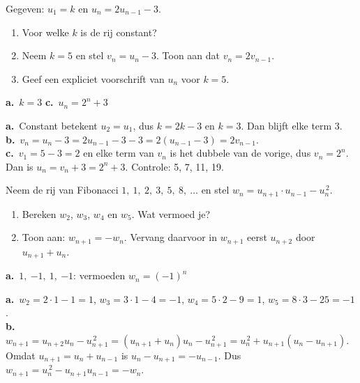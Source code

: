\begin{oefeningen}
\begin{oefening}[3]
Gegeven: $u_1 = k$ en $u_n = 2u_{n-1} - 3$.
\begin{enumerate}
  \item Voor welke $k$ is de rij constant?
  \item Neem $k = 5$ en stel $v_n = u_n - 3$. Toon aan dat $v_n = 2v_{n-1}$.
  \item Geef een expliciet voorschrift van $u_n$ voor $k = 5$.
\end{enumerate}
\begin{solution}
\textbf{a.}~$k=3$ \quad \textbf{c.}~$u_n=2^n+3$
\end{solution}
\begin{fullsolution}
\textbf{a.}~Constant betekent $u_2=u_1$, dus $k=2k-3$ en $k=3$. Dan blijft elke term 3.\\
\textbf{b.}~$v_n=u_n-3=2u_{n-1}-3-3=2(u_{n-1}-3)=2v_{n-1}$.\\
\textbf{c.}~$v_1=5-3=2$ en elke term van $v_n$ is het dubbele van de vorige, dus $v_n=2^n$. Dan is $u_n=v_n+3=2^n+3$. Controle: 5, 7, 11, 19.
\end{fullsolution}
\end{oefening}

\begin{oefening}[3]
Neem de rij van Fibonacci $1,\ 1,\ 2,\ 3,\ 5,\ 8,\ \ldots$ en stel $w_n = u_{n+1} \cdot u_{n-1} - u_n^{\,2}$.
\begin{enumerate}
  \item Bereken $w_2$, $w_3$, $w_4$ en $w_5$. Wat vermoed je?
  \item Toon aan: $w_{n+1} = -w_n$. Vervang daarvoor in $w_{n+1}$ eerst $u_{n+2}$ door $u_{n+1} + u_n$.
\end{enumerate}
\begin{solution}
\textbf{a.}~$1,\ {-1},\ 1,\ {-1}$: vermoeden $w_n=(-1)^n$
\end{solution}
\begin{fullsolution}
\textbf{a.}~$w_2=2\cdot 1-1=1$, $w_3=3\cdot 1-4=-1$, $w_4=5\cdot 2-9=1$, $w_5=8\cdot 3-25=-1$.\\
\textbf{b.}~$w_{n+1}=u_{n+2}u_n-u_{n+1}^{\,2}=(u_{n+1}+u_n)u_n-u_{n+1}^{\,2}=u_n^{\,2}+u_{n+1}(u_n-u_{n+1})$.\\
Omdat $u_{n+1}=u_n+u_{n-1}$ is $u_n-u_{n+1}=-u_{n-1}$. Dus $w_{n+1}=u_n^{\,2}-u_{n+1}u_{n-1}=-w_n$.
\end{fullsolution}
\end{oefening}
\end{oefeningen}


